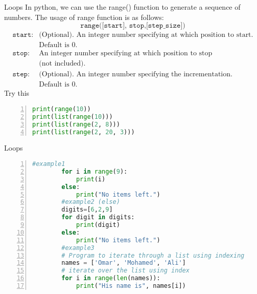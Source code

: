 \begin{frame}[fragile]{Loops}
    In python, we can use the {range()} function to generate a sequence of numbers.
    \pause
    The usage of range function is as follows:
        $$\texttt{range([start], stop,[step\_size])}$$
\begin{align*}
    \texttt{start}: &\text{(Optional). An integer number specifying at which position to start.}\\ 
                    &\text{Default is 0.}\\
    \texttt{stop}:&\text{An integer number specifying at which position to stop}\\
                  & \text{(not included).}\\
    \texttt{step}:&\text{(Optional). An integer number specifying the incrementation.}\\
                  &\text{Default is 0.}
\end{align*}
\pause
    Try this
    \begin{lstlisting}[numbers=left,showstringspaces=false,language=python]
print(range(10))
print(list(range(10)))
print(list(range(2, 8)))
print(list(range(2, 20, 3)))
    \end{lstlisting}        
\end{frame}
\begin{frame}[fragile]{Loops}

    \begin{lstlisting}[numbers=left,showstringspaces=false,language=python]
        #example1
        for i in range(9):
            print(i)
        else:
            print("No items left.")
        #example2 (else)
        digits=[6,2,9]
        for digit in digits:
            print(digit)
        else:
            print("No items left.")
        #example3
        # Program to iterate through a list using indexing
        names = ['Omar', 'Mohamed', 'Ali']
        # iterate over the list using index
        for i in range(len(names)):
            print("His name is", names[i])
    \end{lstlisting}
\end{frame}

